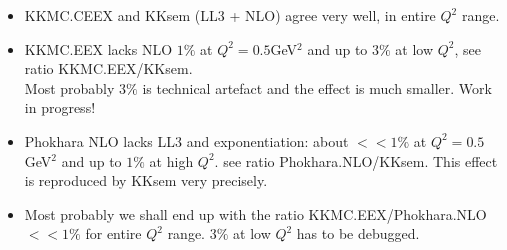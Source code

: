 \documentclass[dvips]{seminar}                      %
\begin{document}
\begin{slide}

{\bf\cbl
  \begin{itemize}
  \item
    KKMC.CEEX and KKsem (LL3 + NLO) agree very well, in entire $Q^2$ range.
  \item
    KKMC.EEX lacks NLO $1\%$ at $Q^2=0.5$GeV$^2$ and up to $3\%$ at low $Q^2$,
    see ratio KKMC.EEX/KKsem.\\
    Most probably $3\%$ is technical artefact and
    the effect is much smaller. Work in progress!
  \item
    Phokhara NLO lacks LL3 and exponentiation: 
    about $<<1\%$ at $Q^2=0.5$GeV$^2$ and up to $1\%$ at high $Q^2$.
    see ratio Phokhara.NLO/KKsem.
    This effect is reproduced by KKsem very precisely.
  \item
    Most probably we shall end up with the ratio KKMC.EEX/Phokhara.NLO 
    $<<1\%$ for entire $Q^2$ range.
    $3\%$ at low $Q^2$ has to be debugged.
  \end{itemize}
}

\vfill
\end{slide}    %
\end{document}
